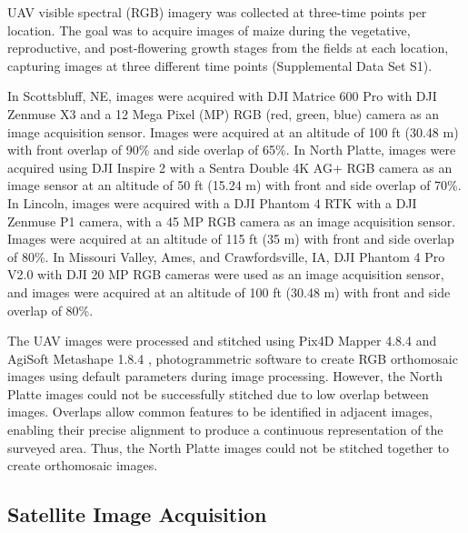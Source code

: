 \documentclass[12pt,twoside]{gsag3jnl}
\begin{document}
UAV visible spectral (RGB) imagery was collected at three-time points per location. The goal was to acquire images of maize during the vegetative, reproductive, and post-flowering growth stages from the fields at each location, capturing images at three different time points (Supplemental Data Set S1).

 In Scottsbluff, NE, images were acquired with DJI Matrice 600 Pro with DJI Zenmuse X3 and a 12 Mega Pixel (MP) RGB (red, green, blue) camera as an image acquisition sensor. Images were acquired at an altitude of 100 ft (30.48 m) with front overlap of 90\% and side overlap of 65\%. In North Platte, images were acquired using DJI Inspire 2 with a Sentra Double 4K AG+ RGB camera as an image sensor at an altitude of 50 ft (15.24 m) with front and side overlap of 70\%. In Lincoln, images were acquired with a DJI Phantom 4 RTK with a DJI Zenmuse P1 camera, with a 45 MP RGB camera as an image acquisition sensor. Images were acquired at an altitude of 115 ft (35 m)  with front and side overlap of 80\%. In Missouri Valley, Ames, and Crawfordsville, IA, DJI Phantom 4 Pro V2.0 with DJI 20 MP RGB cameras were used as an image acquisition sensor, and images were acquired at an altitude of 100 ft (30.48 m) with front and side overlap of 80\%. 

The UAV images were processed and stitched using Pix4D Mapper 4.8.4 \citep{p4d} and AgiSoft Metashape 1.8.4 \citep{agisoft}, photogrammetric software to create RGB orthomosaic images using default parameters during image processing. However, the North Platte images could not be successfully stitched due to low overlap between images. Overlaps allow common features to be identified in adjacent images, enabling their precise alignment to produce a continuous representation of the surveyed area. Thus, the North Platte images could not be stitched together to create orthomosaic images.

\subsection{Satellite Image Acquisition}
\end{document}
